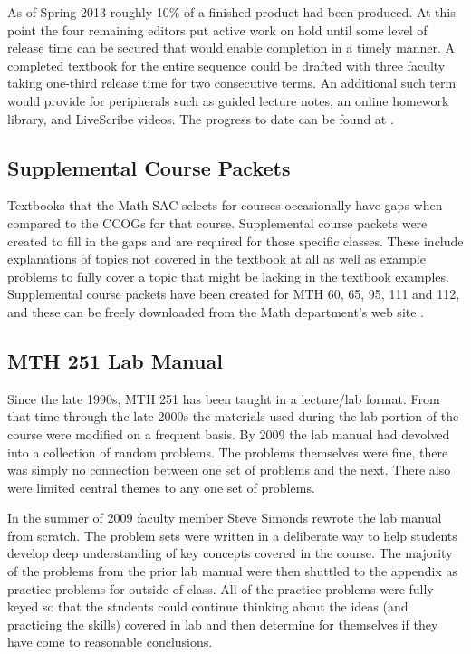 As of Spring 2013 roughly 10\% of a finished product had been produced.  At this
point the four remaining editors put active work on hold until some level of
release time can be secured that would enable completion in a timely manner.  A
completed textbook for the entire sequence could be drafted with three faculty
taking one-third release time for two consecutive terms.  An additional such
term would provide for peripherals such as guided lecture notes, an online
homework library, and LiveScribe videos. The progress to date can be found at
\cite{mth111project}.
 
\subsection{Supplemental Course Packets}
Textbooks that the Math SAC selects for courses occasionally have gaps when
compared to the CCOGs for that course.  Supplemental course packets were created
to fill in the gaps and are required for those specific classes.  These include
explanations of topics not covered in the textbook at all as well as example
problems to fully cover a topic that might be lacking in the textbook examples.
Supplemental course packets have been created for MTH 60, 65, 95, 111 and 112,
and these can be freely downloaded from the Math department's web site
\cite{pccmathdept}.
 
\subsection{MTH 251 Lab Manual}
Since the late 1990s, MTH 251 has been taught in a lecture/lab format.  From
that time through the late 2000s the materials used during the lab portion of
the course were modified on a frequent basis.  By 2009 the lab manual had
devolved into a collection of random problems.  The problems themselves were
fine, there was simply no connection between one set of problems and the next.
There also were limited central themes to any one set of problems.

In the summer of 2009 faculty member Steve Simonds rewrote the lab manual from
scratch.  The problem sets were written in a deliberate way to help students
develop deep understanding of key concepts covered in the course.  The majority
of the problems from the prior lab manual were then shuttled to the appendix as
practice problems for outside of class.  All of the practice problems were fully
keyed so that the students could continue thinking about the ideas (and
practicing the skills) covered in lab and then determine for themselves if they
have come to reasonable conclusions.

